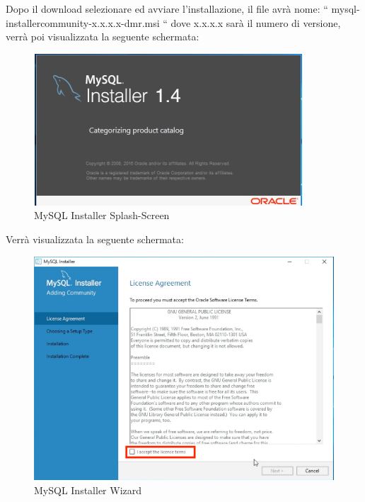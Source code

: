 \begin{itemize}
Dopo il download selezionare ed avviare l’installazione, il file avrà nome: \newline “ mysql-installercommunity-x.x.x.x-dmr.msi “ dove x.x.x.x sarà il numero di versione, verrà poi visualizzata la seguente schermata:

\begin{center}
\begin{figure}[H]
\centering
\includegraphics[scale=1]{figures/mySQLinstaller_splash.png}
\caption{MySQL Installer Splash-Screen}
\end{figure}
\end{center}

Verrà visualizzata la seguente schermata: 

\begin{center}
\begin{figure}[H]
\centering
\includegraphics[scale=0.8]{figures/mySQLinstaller_wizard.png}
\caption{MySQL Installer Wizard}
\end{figure}
\end{center}


\end{itemize}
